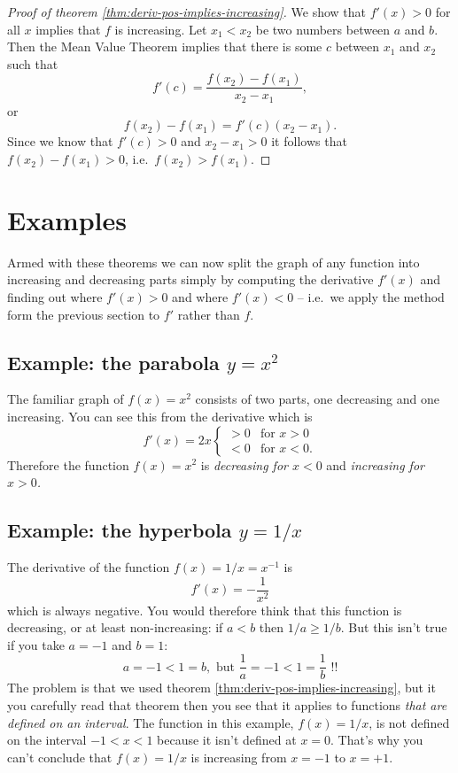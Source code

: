 \begin{proof}[Proof of theorem \ref{thm:deriv-pos-implies-increasing}]
  We show that $f'(x)>0$ for all $x$ implies that $f$ is increasing.
  Let $x_1<x_2$ be two numbers between $a$ and $b$.  Then the Mean Value Theorem
  implies that there is some $c$ between $x_1$ and $x_2$ such that
  \[
  f'(c) = \frac{f(x_2)-f(x_1)}{x_2-x_1},
  \]
  or
  \[
  f(x_2)-f(x_1) = f'(c) (x_2-x_1).
  \]
  Since we know that $f'(c)>0$ and $x_2-x_1>0$ it follows that
  $f(x_2)-f(x_1)>0$, i.e.\ $f(x_2)>f(x_1)$.
\end{proof}

\section{Examples}
Armed with these theorems we can now split the graph of any function into
increasing and decreasing parts simply by computing the derivative $f'(x)$ and
finding out where $f'(x)>0$ and where $f'(x)<0$ -- i.e.\ we apply the method
form the previous section to $f'$ rather than $f$.

\subsection{Example: the parabola $y=x^2$}
The familiar graph of $f(x)=x^2$ consists of two parts, one decreasing and one
increasing.  You can see this from the derivative which is
\[
f'(x) = 2x
\begin{cases}
  >0 & \text{for $x>0$} \\
  <0 & \text{for $x<0$.}
\end{cases}
\]
Therefore the function $f(x) = x^2$ is \emph{decreasing for $x<0$} and
\emph{increasing for $x>0$.}

\begin{figure}[h]
  \centering
  \parbox{170pt}{}
  \quad
  \parbox{170pt}{}
\end{figure}

\subsection{Example: the hyperbola $ y=1/x $}
The derivative of the function $f(x)= 1/x = x^{-1}$ is
\[
f'(x) = -\frac{1}{x^2}
\]
which is always negative.  You would therefore think that this function is
decreasing, or at least non-increasing: if $a<b$ then $1/a \geq 1/b$.  But this
isn't true if you take $a=-1$ and $b=1$:
\[
a=-1<1=b, \text{ but } \frac{1}{a} = -1 < 1 = \frac{1}{b}\text{ !!}
\]
The problem is that we used theorem \ref{thm:deriv-pos-implies-increasing}, but
it you carefully read that theorem then you see that it applies to functions
\emph{that are defined on an interval}.  The function in this example,
$f(x)=1/x$, is not defined on the interval $-1<x<1$ because it isn't defined at
$x=0$.  That's why you can't conclude that $f(x) = 1/x$ is increasing from
$x=-1$ to $x=+1$.

